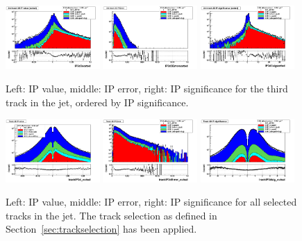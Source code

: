 \begin{figure}[h!]
\centering
\includegraphics[width=0.32\textwidth]{figures/IP3d3sorted_Log.png}
\includegraphics[width=0.32\textwidth]{figures/IP3d3Errorsorted_Log.png}
\includegraphics[width=0.32\textwidth]{figures/IP3d3sigsorted_Log.png}
\caption{Left: IP value, middle: IP error, right: IP significance for the third track in the jet, ordered by IP significance.  }
\label{fig:IPThirdTrack}
\end{figure}

\begin{figure}[h!]
\centering
\includegraphics[width=0.32\textwidth]{figures/trackIP3d_cutsel_Log.png}
\includegraphics[width=0.32\textwidth]{figures/trackIP3dError_cutsel_Log.png}
\includegraphics[width=0.32\textwidth]{figures/trackIP3dsig_cutsel_Log.png}
\caption{Left: IP value, middle: IP error, right: IP significance for all selected tracks in the jet. The track selection as defined in Section~\ref{sec:trackselection} has been applied.}
\label{fig:IPAllTrack}
\end{figure}



